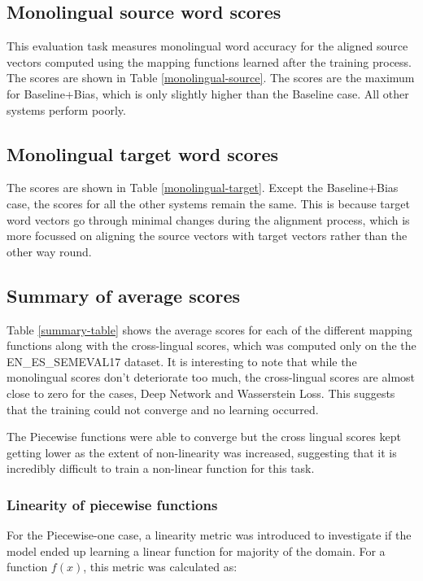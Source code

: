 \documentclass[11pt]{article}
\begin{document}
\subsection{Monolingual source word scores}
This evaluation task measures monolingual word accuracy for the aligned source vectors computed using the mapping functions learned after the training process. The scores are shown in Table \ref{monolingual-source}. The scores are the maximum for Baseline+Bias, which is only slightly higher than the Baseline case. All other systems perform poorly.

\subsection{Monolingual target word scores}
The scores are shown in Table \ref{monolingual-target}. Except the Baseline+Bias case, the scores for all the other systems remain the same. This is because target word vectors go through minimal changes during the alignment process, which is more focussed on aligning the source vectors with target vectors rather than the other way round.

\subsection{Summary of average scores}
Table \ref{summary-table} shows the average scores for each of the different mapping functions along with the cross-lingual scores, which was computed only on the the EN\_ES\_SEMEVAL17 dataset. It is interesting to note that while the monolingual scores don't deteriorate too much, the cross-lingual scores are almost close to zero for the cases, Deep Network and Wasserstein Loss. This suggests that the training could not converge and no learning occurred.

The Piecewise functions were able to converge but the cross lingual scores kept getting lower as the extent of non-linearity was increased, suggesting that it is incredibly difficult to train a non-linear function for this task.

\subsubsection{Linearity of piecewise functions} \label{linearity}
For the Piecewise-one case, a linearity metric was introduced to investigate if the model ended up learning a linear function for majority of the domain. For a function $f(x)$, this metric was calculated as:
\end{document}
